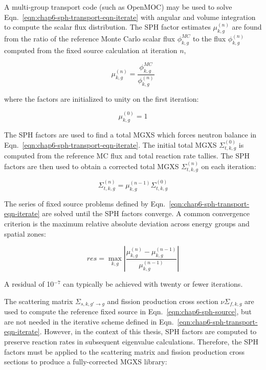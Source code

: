 \noindent A multi-group transport code (such as OpenMOC) may be used to solve Eqn.~\ref{eqn:chap6-sph-transport-eqn-iterate} with angular and volume integration to compute the scalar flux distribution. The \ac{SPH} factor estimates $\mu_{k,g}^{(n)}$ are found from the ratio of the reference Monte Carlo scalar flux $\phi_{k,g}^{MC}$ to the flux $\phi_{k,g}^{(n)}$ computed from the fixed source calculation at iteration $n$,

\begin{equation}
\label{eqn:chap6-sph-update}
\mu_{k,g}^{(n)} = \frac{\phi_{k,g}^{MC}}{\phi_{k,g}^{(n)}}
\end{equation}

\noindent where the factors are initialized to unity on the first iteration:

\begin{dmath}
\label{eqn:chap6-sph-initial}
\mu_{k,g}^{(0)} = 1
\end{dmath}

The \ac{SPH} factors are used to find a total \ac{MGXS} which forces neutron balance in Eqn.~\ref{eqn:chap6-sph-transport-eqn-iterate}. The initial total \ac{MGXS} $\Sigma_{t,k,g}^{(0)}$ is computed from the reference \ac{MC} flux and total reaction rate tallies. The \ac{SPH} factors are then used to obtain a corrected total \ac{MGXS} $\Sigma_{t,k,g}^{(n)}$ on each iteration:

\begin{dmath}
\label{eqn:chap6-sph-update-sigt}
\Sigma_{t,k,g}^{(n)} = \mu_{k,g}^{(n-1)}\Sigma_{t,k,g}^{(0)}
\end{dmath}

The series of fixed source problems defined by Eqn.~\ref{eqn:chap6-sph-transport-eqn-iterate} are solved until the \ac{SPH} factors converge. A common convergence criterion is the maximum relative absolute deviation across energy groups and spatial zones:

\begin{dmath}
\label{eqn:chap6-sph-residual}
res = \max_{k,g} \left|\frac{\mu_{k,g}^{(n)} - \mu_{k,g}^{(n-1)}}{\mu_{k,g}^{(n-1)}}\right|
\end{dmath}

\noindent A residual of 10$^{-7}$ can typically be achieved with twenty or fewer iterations.

The scattering matrix $\Sigma_{s,k,g'\rightarrow g}$ and fission production cross section $\nu\Sigma_{f,k,g}$ are used to compute the reference fixed source in Eqn.~\ref{eqn:chap6-sph-source}, but are not needed in the iterative scheme defined in Eqn.~\ref{eqn:chap6-sph-transport-eqn-iterate}. However, in the context of this thesis, \ac{SPH} factors are computed to preserve reaction rates in subsequent eigenvalue calculations. Therefore, the \ac{SPH} factors must be applied to the scattering matrix and fission production cross sections to produce a fully-corrected \ac{MGXS} library:

